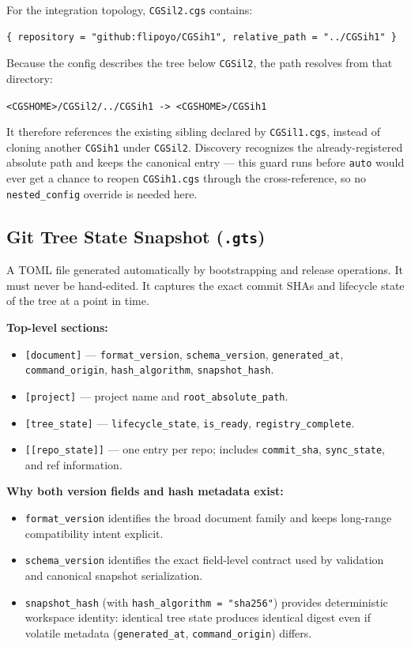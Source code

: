 For the integration topology, \texttt{CGSil2.cgs} contains:

\begin{lstlisting}
{ repository = "github:flipoyo/CGSih1", relative_path = "../CGSih1" }
\end{lstlisting}

Because the config describes the tree below \texttt{CGSil2}, the path resolves
from that directory:

\begin{center}
\texttt{<CGSHOME>/CGSil2/../CGSih1 -> <CGSHOME>/CGSih1}
\end{center}

It therefore references the existing sibling declared by \texttt{CGSil1.cgs},
instead of cloning another \texttt{CGSih1} under \texttt{CGSil2}. Discovery
recognizes the already-registered absolute path and keeps the canonical
entry --- this guard runs before \texttt{auto} would ever get a chance to
reopen \texttt{CGSih1.cgs} through the cross-reference, so no
\texttt{nested\_config} override is needed here.

\subsection{Git Tree State Snapshot (\texttt{.gts})}

A TOML file generated automatically by bootstrapping and release operations.
It must never be hand-edited. It captures the exact commit SHAs and lifecycle
state of the tree at a point in time.

\textbf{Top-level sections:}
\begin{itemize}
  \item \texttt{[document]} — \texttt{format\_version}, \texttt{schema\_version},
        \texttt{generated\_at}, \texttt{command\_origin},
        \texttt{hash\_algorithm}, \texttt{snapshot\_hash}.
  \item \texttt{[project]} — project name and \texttt{root\_absolute\_path}.
  \item \texttt{[tree\_state]} — \texttt{lifecycle\_state}, \texttt{is\_ready},
        \texttt{registry\_complete}.
  \item \texttt{[[repo\_state]]} — one entry per repo; includes
        \texttt{commit\_sha}, \texttt{sync\_state}, and ref information.
\end{itemize}

\textbf{Why both version fields and hash metadata exist:}
\begin{itemize}
  \item \texttt{format\_version} identifies the broad document family and keeps
        long-range compatibility intent explicit.
  \item \texttt{schema\_version} identifies the exact field-level contract used
        by validation and canonical snapshot serialization.
  \item \texttt{snapshot\_hash} (with \texttt{hash\_algorithm = "sha256"})
        provides deterministic workspace identity: identical tree state produces
        identical digest even if volatile metadata (\texttt{generated\_at},
        \texttt{command\_origin}) differs.
\end{itemize}

